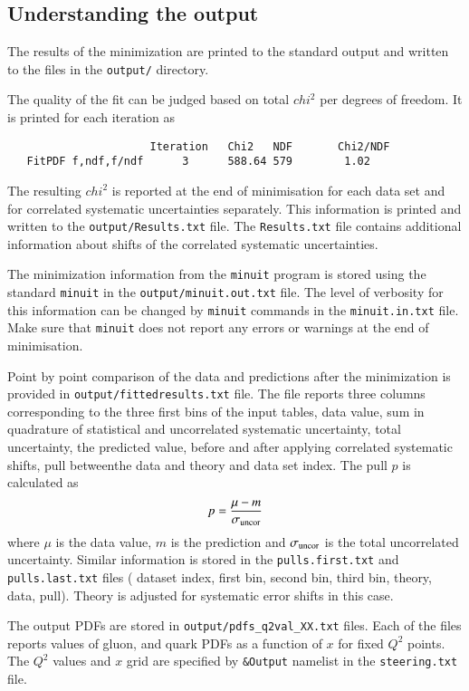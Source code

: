 \documentclass[11pt,a4paper]{article}
\begin{document}
\subsection{Understanding the output}
  The results of the minimization are printed to the standard output and written
  to the files in the {\tt output/} directory. 

  The quality of the fit can be judged based on total $chi^2$ per degrees of freedom.
  It is printed for each iteration as 
\begin{verbatim}
                      Iteration   Chi2   NDF       Chi2/NDF
   FitPDF f,ndf,f/ndf      3      588.64 579        1.02
\end{verbatim}
  The resulting $chi^2$ is reported at the end of minimisation for each data set and for correlated 
  systematic uncertainties separately. This information is printed and written
  to the {\tt output/Results.txt} file. The {\tt Results.txt} file contains additional 
  information about shifts of the correlated systematic uncertainties.

  The minimization information from the {\tt minuit} program is stored using the standard {\tt minuit} in the {\tt output/minuit.out.txt}
  file. The level of verbosity for this information can be changed by {\tt minuit} commands
  in the {\tt minuit.in.txt} file. Make sure that {\tt minuit} does not report any errors
  or warnings at the end of minimisation.
  
  Point by point comparison of the data and predictions after the minimization 
  is provided in {\tt output/fittedresults.txt} file. The file reports three columns
  corresponding to the three first bins of the input tables, data value, sum in 
  quadrature of statistical and uncorrelated systematic uncertainty, total
  uncertainty, the predicted value, before and after applying correlated systematic shifts,
  pull betweenthe  data and theory and 
  data set index. The pull $p$ is calculated as 
  \begin{equation}
      p = \frac{ \mu - m} {\sigma_{\rm uncor}}
  \end{equation}
  where $\mu$ is the data value, $m$ is the prediction and $\sigma_{\rm uncor}$ is the total
  uncorrelated uncertainty.
  Similar information is stored in the {\tt pulls.first.txt} and {\tt pulls.last.txt} files
  ( dataset index, first bin, second bin, third bin, theory, data, pull).
  Theory is  adjusted for systematic error shifts in this case.

  The output PDFs are stored in  {\tt output/pdfs\_q2val\_XX.txt} files.
  Each of the files reports values of gluon, and quark PDFs as a function of $x$
  for fixed $Q^2$ points. The $Q^2$ values and $x$ grid are specified by 
  {\tt \&Output} namelist in the {\tt steering.txt} file.
  
\end{document}
